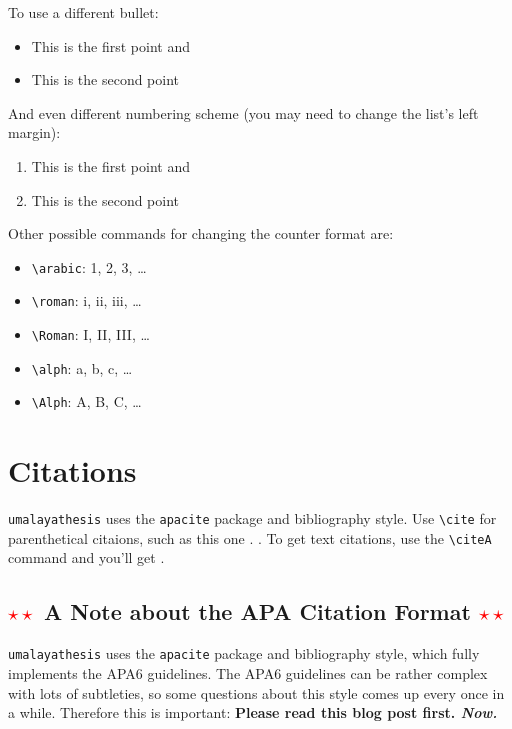 To use a different bullet:

\begin{itemize}[label=$\star$]
  \item This is the first point and
  \item This is the second point
\end{itemize}

And even different numbering scheme (you may need to change the list's left margin):

\begin{enumerate}[label=(\roman*),leftmargin=3em]
  \item This is the first point and
  \item This is the second point
\end{enumerate}

Other possible commands for changing the counter format are:

\begin{itemize}
\item \verb|\arabic|: 1, 2, 3, \ldots
\item \verb|\roman|: i, ii, iii, \ldots
\item \verb|\Roman|: I, II, III, \ldots
\item \verb|\alph|: a, b, c, \ldots
\item \verb|\Alph|: A, B, C, \ldots
\end{itemize}

\section{Citations}

\texttt{umalayathesis} uses the \texttt{apacite} package and bibliography style. Use \verb|\cite| for parenthetical citaions, such as this one \cite{audibert:2004}. \cite{budanitsky:hirst:2006}. To get text citations, use the \verb|\citeA| command and you'll get \cite{audibert:2004}.

\subsection{\textcolor{red}{$\star\star$} A Note about the APA Citation Format \textcolor{red}{$\star\star$}}
\label{sec:apanote}

\texttt{umalayathesis} uses the \texttt{apacite} package and bibliography style, which fully implements the APA6 guidelines. The APA6 guidelines can be rather complex with lots of subtleties, so some questions about this style comes up every once in a while. Therefore this is important: \textbf{Please read this blog post first. \emph{Now.}}

